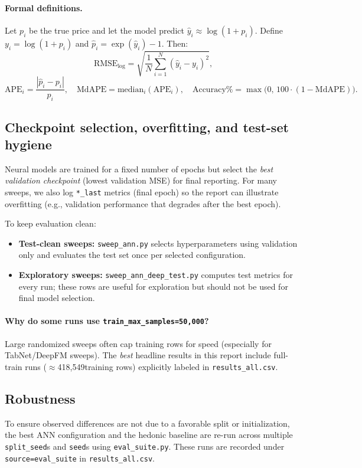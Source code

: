 \documentclass[11pt]{article}
\newcommand{\NTrain}{418{,}549}
\begin{document}
\paragraph{Formal definitions.}
Let \(p_i\) be the true price and let the model predict \(\hat{y}_i \approx \log(1+p_i)\).
Define \(y_i = \log(1+p_i)\) and \(\hat{p}_i = \exp(\hat{y}_i)-1\).
Then:
\[
  \mathrm{RMSE}_{\log} = \sqrt{\frac{1}{N}\sum_{i=1}^N(\hat{y}_i - y_i)^2},
\]
\[
  \mathrm{APE}_i = \frac{|\hat{p}_i - p_i|}{p_i},\quad
  \mathrm{MdAPE} = \mathrm{median}_i(\mathrm{APE}_i),\quad
  \mathrm{Accuracy}\% = \max\!\bigl(0,\,100\cdot(1-\mathrm{MdAPE})\bigr).
\]

\subsection{Checkpoint selection, overfitting, and test-set hygiene}
Neural models are trained for a fixed number of epochs but select the \emph{best validation checkpoint} (lowest validation MSE) for final reporting. For many sweeps, we also log \texttt{*\_last} metrics (final epoch) so the report can illustrate overfitting (e.g., validation performance that degrades after the best epoch).

To keep evaluation clean:
\begin{itemize}[leftmargin=*]
  \item \textbf{Test-clean sweeps:} \texttt{sweep\_ann.py} selects hyperparameters using validation only and evaluates the test set once per selected configuration.
  \item \textbf{Exploratory sweeps:} \texttt{sweep\_ann\_deep\_test.py} computes test metrics for every run; these rows are useful for exploration but should not be used for final model selection.
\end{itemize}

\paragraph{Why do some runs use \texttt{train\_max\_samples=50,000}?}
Large randomized sweeps often cap training rows for speed (especially for TabNet/DeepFM sweeps). The \emph{best} headline results in this report include full-train runs (\(\approx\)\NTrain training rows) explicitly labeled in \texttt{results\_all.csv}.

\subsection{Robustness}
To ensure observed differences are not due to a favorable split or initialization, the best ANN configuration and the hedonic baseline are re-run across multiple \texttt{split\_seed}s and \texttt{seed}s using \texttt{eval\_suite.py}. These runs are recorded under \texttt{source=eval\_suite} in \texttt{results\_all.csv}.
\end{document}

